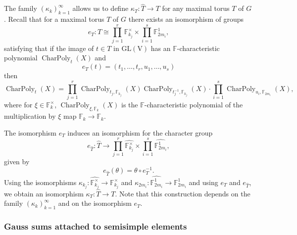 \documentclass[12pt, reqno]{amsart}
\theoremstyle{definition}
\theoremstyle{definition}
\theoremstyle{definition}
\newcommand{\multiplicativegroup}[1]{#1^{\times}}
\newcommand{\hermitianSpace}{\mathrm{V}}
\newcommand{\GL}{\mathrm{GL}}
\newcommand{\finiteField}{\mathbb{F}}
\newcommand{\finiteFieldExtension}[1]{\finiteField_{#1}}
\newcommand{\charactergroup}[1]{\widehat{\multiplicativegroup{\finiteFieldExtension{#1}}}}
\newcommand{\ToriDualToriIsomorphism}{\kappa}
\newcommand{\characteristicPolynomial}{\operatorname{CharPoly}}
\begin{document}
The family $\left(\ToriDualToriIsomorphism_k\right)_{k=1}^{\infty}$ allows us to define $\ToriDualToriIsomorphism_T \colon \widehat{T} \to T$ for any maximal torus $T$ of $G$. Recall that for a maximal torus $T$ of $G$ there exists an isomorphism of groups $$e_T \colon T \cong \prod_{j=1}^r \multiplicativegroup{\finiteFieldExtension{k_j}} \times \prod_{i=1}^s \finiteFieldExtension{2m_i}^1,$$
satisfying that if the image of $t \in T$ in $\GL\left(\hermitianSpace\right)$ has an $\finiteField$-characteristic polynomial $\characteristicPolynomial_{t}\left(X\right)$ and $$e_T\left(t\right) = \left(t_1,\dots,t_r,u_1,\dots,u_s\right)$$ then $$\characteristicPolynomial_{t}\left(X\right) = \prod_{j=1}^r \characteristicPolynomial_{t_j, \finiteFieldExtension{k_j}}\left(X\right) \characteristicPolynomial_{t_j^{-1}, \finiteFieldExtension{k_j}}\left(X\right) \cdot \prod_{i=1}^s \characteristicPolynomial_{u_i, \finiteFieldExtension{2 m_i}}\left(X\right),$$
where for $\xi \in \multiplicativegroup{\finiteFieldExtension{k}}$, $\characteristicPolynomial_{\xi, \finiteFieldExtension{k}}\left(X\right)$ is the $\finiteField$-characteristic polynomial of the multiplication by $\xi$ map $\finiteFieldExtension{k} \to \finiteFieldExtension{k}$.

The isomorphism $e_T$ induces an isomorphism for the character group $$e_{\widehat{T}} \colon \widehat{T} \to \prod_{j=1}^r \charactergroup{k_j} \times \prod_{i=1}^s \widehat{\finiteFieldExtension{2m_i}^1},$$
given by
$$e_{\widehat{T}}\left(\theta\right) = \theta \circ e_T^{-1}.$$
Using the isomorphisms $\ToriDualToriIsomorphism_{k_j} \colon \charactergroup{k_j} \to \multiplicativegroup{\finiteFieldExtension{k_j}}$ and $\ToriDualToriIsomorphism_{2m_i} \colon \widehat{\finiteFieldExtension{2m_i}^1} \to \finiteFieldExtension{2m_i}^1$ and using $e_T$ and $e_{\widehat{T}}$, we obtain an isomorphism $\ToriDualToriIsomorphism_{T} \colon \widehat{T} \to T$. Note that this construction depends on the family $\left(\ToriDualToriIsomorphism_k\right)_{k=1}^{\infty}$ and on the isomorphism $e_T$.



\subsubsection{Gauss sums attached to semisimple elements}
\end{document}
